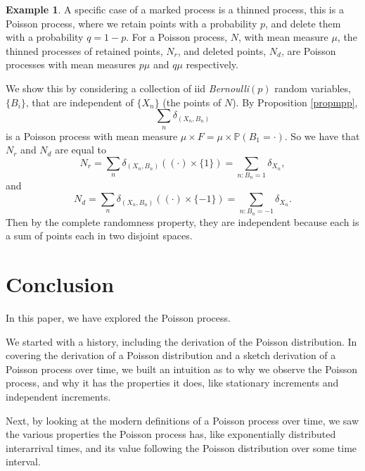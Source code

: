 \documentclass[11pt, oneside]{article}   	%
\theoremstyle{definition}
\newtheorem{example}{Example}[section]
\theoremstyle{remark}
\begin{document}
\begin{example}
  A specific case of a marked process is a thinned process, this is a Poisson process, where we retain points with a probability $p$, and delete them with a probability $q=1-p$. For a Poisson process, $N$, with mean measure $\mu$, the thinned processes of retained points, $N_r$, and deleted points, $N_d$, are Poisson processes with mean measures $p \mu$ and $q \mu$ respectively.

  We show this by considering a collection of iid \textit{Bernoulli}$(p)$ random variables, $\{B_i\}$, that are independent of $\{X_n\}$ (the points of $N$). By Proposition \ref{propmpp},
  $$\sum_{n} \delta_{(X_n, B_n)}$$ is a Poisson process with mean measure $\mu \times F = \mu \times \mathbb{P}(B_1=\cdot)$. So we have that $N_r$ and $N_d$ are equal to
  $$N_r = \sum_{n} \delta_{(X_n, B_n)} ((\cdot) \times \{1\}) = \sum_{n : B_n=1} \delta_{X_n},$$
  and
  $$N_d = \sum_{n} \delta_{(X_n, B_n)} ((\cdot) \times \{-1\}) = \sum_{n : B_n=-1} \delta_{X_n}.$$
  Then by the complete randomness property, they are independent because each is a sum of points each in two disjoint spaces.
\end{example}



\newpage
\section{Conclusion}
In this paper, we have explored the Poisson process.

We started with a history, including the derivation of the Poisson distribution. In covering the derivation of a Poisson distribution and a sketch derivation of a Poisson process over time, we built an intuition as to why we observe the Poisson process, and why it has the properties it does, like stationary increments and independent increments.

Next, by looking at the modern definitions of a Poisson process over time, we saw the various properties the Poisson process has, like exponentially distributed interarrival times, and its value following the Poisson distribution over some time interval.
\end{document}
